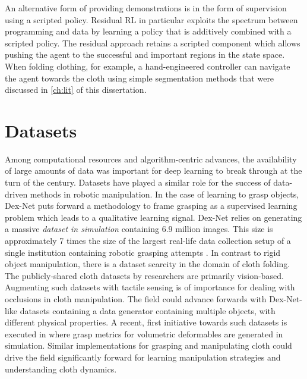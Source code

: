 \documentclass[\home/main.tex]{subfiles}
\begin{document}
An alternative form of providing demonstrations is in the form of supervision using a scripted policy. Residual RL in particular exploits the spectrum between programming and data by learning a policy that is additively combined with a scripted policy. The residual approach retains a scripted component which allows pushing the agent to the successful and important regions in the state space. When folding clothing, for example, a hand-engineered controller can navigate the agent towards the cloth using simple segmentation methods that were discussed in \cref{ch:lit} of this dissertation. 

\section{Datasets}

Among computational resources and algorithm-centric advances, the availability of large amounts of data was important for deep learning to break through at the turn of the century. Datasets have played a similar role for the success of data-driven methods in robotic manipulation. In the case of learning to grasp objects, Dex-Net \autocite{dexnet2} puts forward a methodology to frame grasping as a supervised learning problem which leads to a qualitative learning signal. Dex-Net relies on generating a massive \emph{dataset in simulation} containing 6.9 million images. This size is approximately 7 times the size of the largest real-life data collection setup of a single institution containing robotic grasping attempts \autocite{Levine2016}. In contrast to rigid object manipulation, there is a dataset scarcity in the domain of cloth folding. The publicly-shared cloth datasets by researchers are primarily vision-based. Augmenting such datasets with tactile sensing is of importance for dealing with occlusions in cloth manipulation. The field could advance forwards with Dex-Net-like datasets containing a data generator containing multiple objects, with different physical properties. A recent, first initiative towards such datasets is executed in \textcite{DefGraspSim} where grasp metrics for volumetric deformables are generated in simulation. Similar implementations for grasping and manipulating cloth could drive the field significantly forward for learning manipulation strategies and understanding cloth dynamics. 
\end{document}
